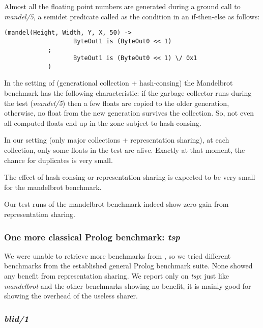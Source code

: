 \documentclass{tlp}
\begin{document}
Almost all the floating point numbers are generated during a ground
call to {\em mandel/5}, a semidet predicate called as the condition in an
if-then-else as follows:
\begin{Verbatim}[fontsize=\small, frame=single,samepage=true]
            (mandel(Height, Width, Y, X, 50) ->
                   ByteOut1 is (ByteOut0 << 1)
            ;
                   ByteOut1 is (ByteOut0 << 1) \/ 0x1
            )
\end{Verbatim}

In the setting of \cite{appelhashconsinggc} (generational collection +
hash-consing) the Mandelbrot benchmark has the following
characteristic: if the garbage collector runs during the test
({\em mandel/5}) then a few floats are copied to the older generation,
otherwise, no float from the new generation survives the collection.
So, not even all computed floats end up in the zone subject to
hash-consing.

In our setting (only major collections + representation sharing),
at each collection, only some floats in the test are alive. Exactly at
that moment, the chance for duplicates is very small.

The effect of hash-consing or representation sharing is expected to be
very small for the mandelbrot benchmark.

Our test runs of the mandelbrot benchmark indeed show zero gain from
representation sharing.



\subsubsection{One more classical Prolog benchmark: {\em tsp}} 

We were unable to retrieve more benchmarks from
\cite{appelhashconsinggc}, so we tried different benchmarks from the
established general Prolog benchmark suite. None showed any benefit
from representation sharing. We report only on {\em tsp}: just like
{\em mandelbrot} and the other benchmarks showing no benefit, it is
mainly good for showing the overhead of the useless sharer.



\subsubsection{{\em blid/1}}\label{blid}
\end{document}
